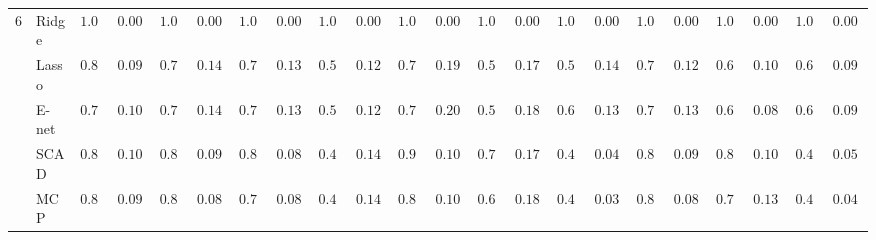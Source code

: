 \begin{tabular}{p{0.2cm}p{1cm}|p{0.6cm}p{0.6cm}|p{0.6cm}p{0.6cm}p{0.6cm}p{0.6cm}p{0.6cm}p{0.6cm}|p{0.6cm}p{0.6cm}p{0.6cm}p{0.6cm}p{0.6cm}p{0.6cm}|p{0.6cm}p{0.6cm}p{0.6cm}p{0.6cm}p{0.6cm}p{0.6cm}}
6 & Ridge  & $1.000$ & $0.0000$ & $1.000$ & $0.0000$ & $1.000$ & $0.0000$ & $1.000$ & $0.0000$ & $1.000$ & $0.0000$ & $1.000$ & $0.0000$ & $1.000$ & $0.0000$ & $1.000$ & $0.0000$ & $1.000$ & $0.0000$ & $1.000$ & $0.0000$ \\
 & Lasso  & $0.816$ & $0.0972$ & $0.794$ & $0.1434$ & $0.732$ & $0.1399$ & $0.534$ & $0.1241$ & $0.780$ & $0.1959$ & $0.534$ & $0.1799$ & $0.544$ & $0.1479$ & $0.788$ & $0.1297$ & $0.646$ & $0.1096$ & $0.610$ & $0.0916$ \\
 & E-net  & $0.792$ & $0.1061$ & $0.784$ & $0.1441$ & $0.716$ & $0.1369$ & $0.542$ & $0.1216$ & $0.754$ & $0.2047$ & $0.528$ & $0.1875$ & $0.668$ & $0.1309$ & $0.772$ & $0.1334$ & $0.640$ & $0.0899$ & $0.642$ & $0.0955$ \\
 & SCAD  & $0.894$ & $0.1003$ & $0.872$ & $0.0965$ & $0.840$ & $0.0804$ & $0.470$ & $0.1460$ & $0.900$ & $0.1005$ & $0.750$ & $0.1714$ & $0.410$ & $0.0438$ & $0.882$ & $0.0989$ & $0.800$ & $0.1064$ & $0.414$ & $0.0586$ \\
 & MCP  & $0.864$ & $0.0938$ & $0.842$ & $0.0819$ & $0.794$ & $0.0827$ & $0.448$ & $0.1425$ & $0.864$ & $0.1059$ & $0.694$ & $0.1852$ & $0.408$ & $0.0394$ & $0.850$ & $0.0870$ & $0.756$ & $0.1351$ & $0.404$ & $0.0400$ \\
\hline 
\end{tabular}

